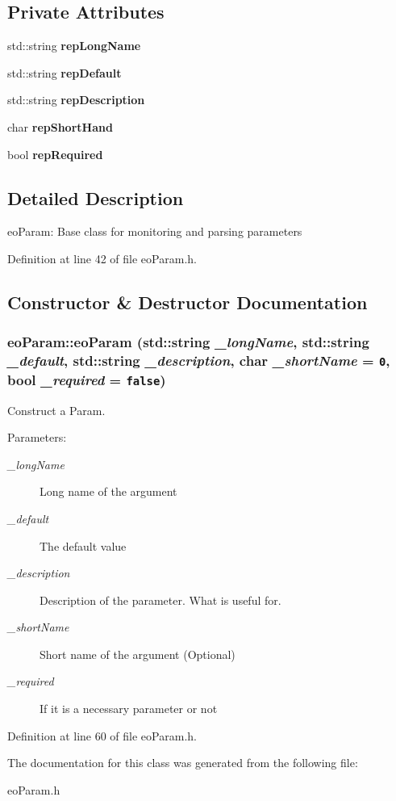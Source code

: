 \subsection*{Private Attributes}
\begin{CompactItemize}
\item 
std::string {\bf rep\-Long\-Name}\label{classeo_param_r0}

\item 
std::string {\bf rep\-Default}\label{classeo_param_r1}

\item 
std::string {\bf rep\-Description}\label{classeo_param_r2}

\item 
char {\bf rep\-Short\-Hand}\label{classeo_param_r3}

\item 
bool {\bf rep\-Required}\label{classeo_param_r4}

\end{CompactItemize}


\subsection{Detailed Description}
eo\-Param: Base class for monitoring and parsing parameters 



Definition at line 42 of file eo\-Param.h.

\subsection{Constructor \& Destructor Documentation}
\subsubsection{\setlength{\rightskip}{0pt plus 5cm}eo\-Param::eo\-Param (std::string {\em \_\-long\-Name}, std::string {\em \_\-default}, std::string {\em \_\-description}, char {\em \_\-short\-Name} = {\tt 0}, bool {\em \_\-required} = {\tt false})\hspace{0.3cm}{\tt  [inline]}}\label{classeo_param_a1}


Construct a Param. 

\begin{Desc}
\item[Parameters:]
\begin{description}
\item[{\em \_\-long\-Name}]Long name of the argument \item[{\em \_\-default}]The default value \item[{\em \_\-description}]Description of the parameter. What is useful for. \item[{\em \_\-short\-Name}]Short name of the argument (Optional) \item[{\em \_\-required}]If it is a necessary parameter or not \end{description}
\end{Desc}


Definition at line 60 of file eo\-Param.h.

The documentation for this class was generated from the following file:\begin{CompactItemize}
\item 
eo\-Param.h\end{CompactItemize}

